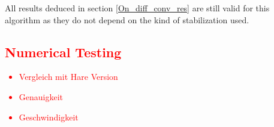 \begin{remark}
	All results deduced in section \ref{On_diff_conv_res} are still valid for this algorithm as they do not depend on the kind of stabilization used.
\end{remark}

\textcolor{red}{\subsection{Numerical Testing}}

\textcolor{red}{
\begin{itemize}
	\item Vergleich mit Hare Version
	\item Genauigkeit
	\item Geschwindigkeit
\end{itemize}}










